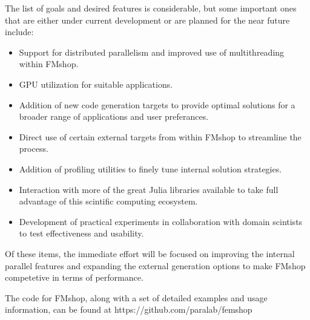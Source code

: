 \documentclass[twoside,leqno,twocolumn]{article}
\begin{document}
The list of goals and desired features is considerable, but some important ones that are either under current development or are planned for the near future include:\\
\begin{itemize}
\item Support for distributed parallelism and improved use of multithreading within FMshop.
\item GPU utilization for suitable applications.
\item Addition of new code generation targets to provide optimal solutions for a broader range of applications and user preferances.
\item Direct use of certain external targets from within FMshop to streamline the process.
\item Addition of profiling utilities to finely tune internal solution strategies.
\item Interaction with more of the great Julia libraries available to take full advantage of this scintific computing ecosystem.
\item Development of practical experiments in collaboration with domain scintists to test effectiveness and usability.
\end{itemize}

Of these items, the immediate effort will be focused on improving the internal parallel features and expanding the external generation options to make FMshop competetive in terms of performance. 

The code for FMshop, along with a set of detailed examples and usage information, can be found at https://github.com/paralab/femshop
\end{document}
